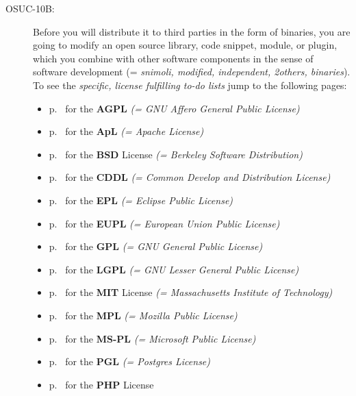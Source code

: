 \begin{description}
\item[OSUC-10B:]\label{OSUC-10B-DEF} Before you will distribute it to third parties
in the form of binaries, you are going to modify an open source library, code
snippet, module, or plugin, which you combine with other software components in
the sense of software development (= \textit{snimoli, modified, independent,
2others, binaries}). To see the \textit{specific, license fulfilling to-do
lists} jump to the following pages:
  \begin{itemize}
    \item p.\ \pageref{OSUC-10B-AGPL} for the \textbf{AGPL}
      \textit{(= GNU Affero General Public License)} 
    \item p.\ \pageref{OSUC-10B-Apache20} for the \textbf{ApL}
      \textit{(= Apache License)}
    \item p.\ \pageref{OSUC-10B-BSD} for the \textbf{BSD} License
      \textit{(= Berkeley Software Distribution)}
    \item p.\ \pageref{OSUC-10B-CDDL} for the \textbf{CDDL}
      \textit{(= Common Develop and Distribution License)}  
    \item p.\ \pageref{OSUC-10B-EPL} for the \textbf{EPL}
      \textit{(= Eclipse Public License)}     
    \item p.\ \pageref{OSUC-10B-EUPL} for the \textbf{EUPL}
      \textit{(= European Union Public License)} 
    \item p.\ \pageref{OSUC-10B-GPL} for the \textbf{GPL}
       \textit{(= GNU General Public License)} 
    \item p.\ \pageref{OSUC-10B-LGPL} for the \textbf{LGPL}
      \textit{(= GNU Lesser General Public License)}           
    \item p.\ \pageref{OSUC-10B-MIT} for the \textbf{MIT} License
       \textit{(= Massachusetts Institute of Technology)} 
    \item p.\ \pageref{OSUC-10B-MPL} for the \textbf{MPL}
      \textit{(= Mozilla Public License)}     
    \item p.\ \pageref{OSUC-10B-MS-PL} for the \textbf{MS-PL}
      \textit{(= Microsoft Public License)} 
    \item p.\ \pageref{OSUC-10B-PGL} for the \textbf{PGL}
      \textit{(= Postgres License)} 
    \item p.\ \pageref{OSUC-10B-PHP} for the \textbf{PHP} License 
  \end{itemize}

\end{description}

%
